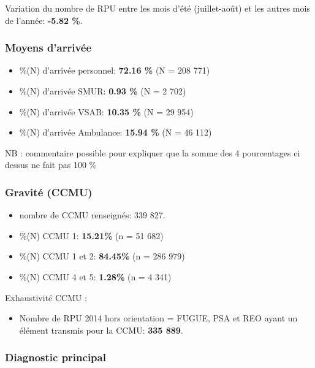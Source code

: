 \documentclass[]{article}
\begin{document}
Variation du nombre de RPU entre les mois d'été (juillet-août) et les
autres mois de l'année: \textbf{-5.82 \%}.

\subsubsection{Moyens d'arrivée}\label{moyens-darrivee}

\begin{itemize}
\itemsep1pt\parskip0pt
\item
  \%(N) d'arrivée personnel: \textbf{72.16 \%} (N = 208 771)
\item
  \%(N) d'arrivée SMUR: \textbf{0.93 \%} (N = 2 702)
\item
  \%(N) d'arrivée VSAB: \textbf{10.35 \%} (N = 29 954)
\item
  \%(N) d'arrivée Ambulance: \textbf{15.94 \%} (N = 46 112)
\end{itemize}

NB : commentaire possible pour expliquer que la somme des 4 pourcentages
ci dessus ne fait pas 100 \%

\subsubsection{Gravité (CCMU)}\label{gravite-ccmu}

\begin{itemize}
\itemsep1pt\parskip0pt
\item
  nombre de CCMU renseignés: 339 827.
\item
  \%(N) CCMU 1: \textbf{15.21\%} (n = 51 682)
\item
  \%(N) CCMU 1 et 2: \textbf{84.45\%} (n = 286 979)
\item
  \%(N) CCMU 4 et 5: \textbf{1.28\%} (n = 4 341)
\end{itemize}

Exhaustivité CCMU :

\begin{itemize}
\itemsep1pt\parskip0pt
\item
  Nombre de RPU 2014 hors orientation = FUGUE, PSA et REO ayant un
  élément transmis pour la CCMU: \textbf{335 889}.
\end{itemize}

\subsubsection{Diagnostic principal}\label{diagnostic-principal}
\end{document}
